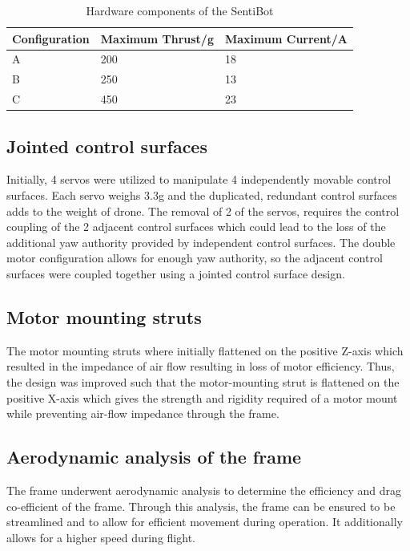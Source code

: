 \documentclass[12pt]{article}
\begin{document}
\begin{table}
	\begin{tabular}{ | l | l l | }
		Configuration & Maximum Thrust/g & Maximum Current/A \\
		\hline
		A & 200 & 18 \\
		B & 250 & 13 \\
		C & 450 & 23 \\
	\end{tabular}
	\caption{Hardware components of the SentiBot}
	\label{fig:sb-configs}
\end{table}

\subsection{Jointed control surfaces}

Initially, 4 servos were utilized to manipulate 4 independently movable control surfaces. Each servo weighs 3.3g and the duplicated, redundant control surfaces adds to the weight of drone. The removal of 2 of the servos, requires the control coupling of the 2 adjacent control surfaces which could lead to the loss of the additional yaw authority provided by independent control surfaces. The double motor configuration allows for enough yaw authority, so the adjacent control surfaces were coupled together using a jointed control surface design.

\subsection{Motor mounting struts}

The motor mounting struts where initially flattened on the positive Z-axis which resulted in the impedance of air flow resulting in loss of motor efficiency. Thus, the design was improved such that the motor-mounting strut is flattened on the positive X-axis which gives the strength and rigidity required of a motor mount while preventing air-flow impedance through the frame.

\subsection{Aerodynamic analysis of the frame}

The frame underwent aerodynamic analysis to determine the efficiency and drag co-efficient of the frame. Through this analysis, the frame can be ensured to be streamlined and to allow for efficient movement during operation. It additionally allows for a higher speed during flight.
\end{document}
